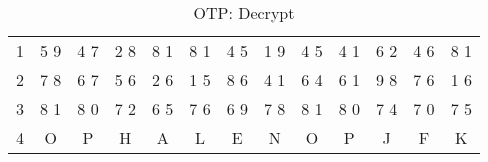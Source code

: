 \begin{table}[h!]
\centering
\begin{tabular}{ | c || c | c | c | c | c | c | c | c | c | c | c | c | }
\hline
	1 & 5 9 & 4 7 & 2 8 & 8 1 & 8 1  & 4 5 & 1 9 & 4 5 & 4 1 & 6 2 & 4 6 & 8 1 \\
	2 & 7 8 & 6 7 & 5 6 & 2 6 & 1 5  & 8 6 & 4 1 & 6 4 & 6 1 & 9 8 & 7 6 & 1 6 \\
	3 & 8 1 & 8 0 & 7 2 & 6 5 & 7 6  & 6 9 & 7 8 & 8 1 & 8 0 & 7 4 & 7 0 & 7 5 \\
	4 &  O  &  P  &  H  &  A  &  L   &  E  &  N  &  O  &  P  &  J  &  F  &  K \\
\hline
\end{tabular}
\caption{OTP: Decrypt}
\label{tab:otp:decrypt}
\end{table}
